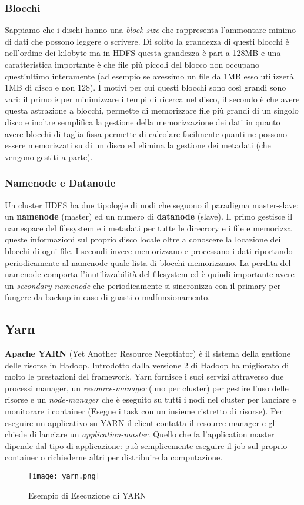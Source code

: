 \subsubsection{Blocchi}
Sappiamo che i dischi hanno una \textit{block-size} che rappresenta l'ammontare minimo di dati che possono leggere o scrivere. Di solito la grandezza di questi blocchi è nell'ordine dei kilobyte ma in HDFS questa grandezza è pari a 128MB e una caratteristica importante è che file più piccoli del blocco non occupano quest'ultimo interamente (ad esempio se avessimo un file da 1MB esso utilizzerà 1MB di disco e non 128). I motivi per cui questi blocchi sono così grandi sono vari: il primo è per minimizzare i tempi di ricerca nel disco, il secondo è che avere questa astrazione a blocchi, permette di memorizzare file più grandi di un singolo disco e inoltre semplifica la gestione della memorizzazione dei dati in quanto avere blocchi di taglia fissa permette di calcolare facilmente quanti ne possono essere memorizzati su di un disco ed elimina la gestione dei metadati (che vengono gestiti a parte).
\subsubsection{Namenode e Datanode}
Un cluster HDFS ha due tipologie di nodi che seguono il paradigma master-slave: un \textbf{namenode} (master) ed un numero di \textbf{datanode} (slave). Il primo gestisce il namespace del filesystem e i metadati per tutte le direcrory e i file e memorizza queste informazioni sul proprio disco locale oltre a conoscere la locazione dei blocchi di ogni file. I secondi invece memorizzano e processano i dati riportando periodicamente al namenode quale lista di blocchi memorizzano. La perdita del namenode comporta l'inutilizzabilità del filesystem ed è quindi importante avere un \textit{secondary-namenode} che periodicamente si sincronizza con il primary per fungere da backup in caso di guasti o malfunzionamento.
\subsection{Yarn}
\textbf{Apache YARN} (Yet Another Resource Negotiator) è il sistema della gestione delle risorse in Hadoop. Introdotto dalla versione 2 di Hadoop ha migliorato di molto le prestazioni del framework. Yarn fornisce i suoi servizi attraverso due processi manager, un \textit{resource-manager} (uno per cluster) per gestire l'uso delle risorse e un \textit{node-manager} che è eseguito su tutti i nodi nel cluster per lanciare e monitorare i container (Esegue i task con un insieme ristretto di risorse). Per eseguire un applicativo su YARN il client contatta il resource-manager e gli chiede di lanciare un \textit{application-master}. Quello che fa l'application master dipende dal tipo di applicazione: può semplicemente eseguire il job sul proprio container o richiederne altri per distribuire la computazione.
\begin{figure}[H]
  \begin{center}
    \texttt{[image: yarn.png]}
    \caption{Esempio di Esecuzione di YARN}
    \label{fg:yarn.png}
  \end{center}
\end{figure}
